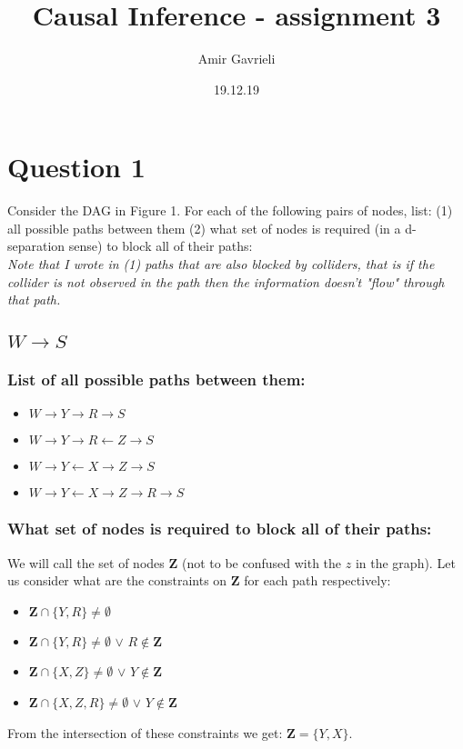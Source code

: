 \documentclass{article}
\title{Causal Inference - assignment 3}
\author{Amir Gavrieli}
\date{19.12.19}
\begin{document}
\maketitle

\section*{Question 1}
Consider the DAG in Figure 1. For each of the following pairs of nodes, list: (1) all possible paths between them (2) what set of nodes is required (in a d-separation sense) to block all of their paths: \\
\textit{Note that I wrote in (1) paths that are also blocked by colliders, that is if the collider is not observed in the path then the information doesn't "flow" through that path.}
\subsection{$W\rightarrow{}S$}
\subsubsection{List of all possible paths between them:}

\begin{itemize}
    \item $W \rightarrow{} Y \rightarrow{} R \rightarrow{} S$
    \item $W \rightarrow{} Y \rightarrow{} R \leftarrow{} Z \rightarrow{} S$
    \item $W \rightarrow{} Y \leftarrow{} X \rightarrow{} Z \rightarrow{} S$
    \item $W \rightarrow{} Y \leftarrow{} X \rightarrow{} Z \rightarrow{} R \rightarrow S$
\end{itemize}
\subsubsection{What set of nodes is required to block all of their paths:}
We will call the set of nodes $\mathbf{Z}$ (not to be confused with the $z$ in the graph). Let us consider what are the constraints on $\mathbf{Z}$ for each path respectively:
\begin{itemize}
    \item $\mathbf{Z} \cap \{Y,R\} \neq \emptyset$
    \item $\mathbf{Z} \cap \{Y,R\} \neq \emptyset$  $\lor$ $R \notin \mathbf{Z}$
    \item $\mathbf{Z} \cap \{X,Z\} \neq \emptyset$  $\lor$ $Y \notin \mathbf{Z}$
    \item $\mathbf{Z} \cap \{X,Z,R\} \neq \emptyset$  $\lor$ $Y \notin \mathbf{Z}$
\end{itemize}
From the intersection of these constraints we get: $\mathbf{Z} = \{Y, X\}$.
\end{document}

